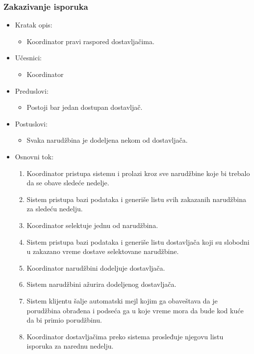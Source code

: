 
\subsubsection{Zakazivanje isporuka}

\begin{itemize}
	\item Kratak opis:
		\begin{itemize}
			\item Koordinator pravi raspored dostavljačima.
		\end{itemize}
	\item Učesnici:
		\begin{itemize}
		    \item Koordinator
		\end{itemize}
	\item Preduslovi:
		\begin{itemize}
		    \item Postoji bar jedan dostupan dostavljač.
		\end{itemize}
	\item Postuslovi:
		\begin{itemize}
			\item Svaka narudžbina je dodeljena nekom od dostavljača.
	\end{itemize}
	\item Osnovni tok:
		\begin{enumerate}
            \item Koordinator pristupa sistemu i prolazi kroz sve narudžbine koje bi trebalo da se obave sledeće nedelje.
            \item Sistem pristupa bazi podataka i generiše listu svih zakazanih narudžbina za sledeću nedelju.
            \item Koordinator selektuje jednu od narudžbina.
            \item Sistem pristupa bazi podataka i generiše listu dostavljača koji su slobodni u zakazano vreme dostave selektovane narudžbine.
           \item Koordinator narudžbini dodeljuje dostavljača.
           \item Sistem narudžbini ažurira dodeljenog dostavljača.
            \item Sistem klijentu šalje automatski mejl kojim ga obaveštava da je porudžbina obrađena i podseća  ga u koje vreme mora da bude kod kuće da bi primio porudžbinu.
            \item Koordinator dostavljačima preko sistema prosleđuje njegovu listu isporuka za narednu nedelju.

\end{enumerate}
\end{itemize}
